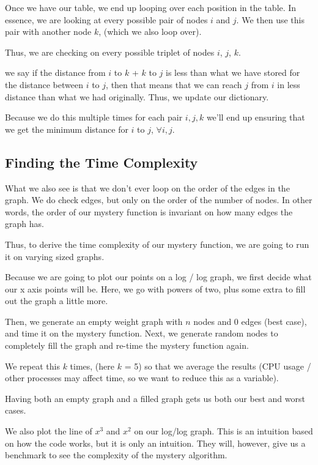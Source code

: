 \documentclass{article}
\begin{document}
Once we have our table, we end up looping over each position in the table. In essence, we are looking at every possible pair of nodes $i$ and $j$. We then use this pair with another node $k$, (which we also loop over).

Thus, we are checking on every possible triplet of nodes $i$, $j$, $k$.

we say if the distance from $i$ to $k$ + $k$ to $j$ is less than what we have stored for the distance between $i$ to $j$, then that means that we can reach $j$ from $i$ in less distance than what we had originally. Thus, we update our dictionary.

Because we do this multiple times for each pair $i,j,k$ we'll end up ensuring that we get the minimum distance for $i$ to $j$, $\forall i, j$.

\subsection{Finding the Time Complexity}

What we also see is that we don't ever loop on the order of the edges in the graph. We do check edges, but only on the order of the number of nodes. In other words, the order of our mystery function is invariant on how many edges the graph has.

Thus, to derive the time complexity of our mystery function, we are going to run it on varying sized graphs.

Because we are going to plot our points on a log / log graph, we first decide what our x axis points will be. Here, we go with powers of two, plus some extra to fill out the graph a little more.

Then, we generate an empty weight graph with $n$ nodes and 0 edges (best case), and time it on the mystery function. Next, we generate random nodes to completely fill the graph and re-time the mystery function again.

We repeat this $k$ times, (here $k$ = 5) so that we average the results (CPU usage / other processes may affect time, so we want to reduce this as a variable).

Having both an empty graph and a filled graph gets us both our best and worst cases.

We also plot the line of $x^3$ and $x^2$ on our log/log graph. This is an intuition based on how the code works, but it is only an intuition. They will, however, give us a benchmark to see the complexity of the mystery algorithm.
\end{document}
